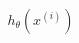 \documentclass[preview]{standalone}
\begin{document}
\begin{align*}
h_{\theta}(x^{(i)})
\end{align*}
\end{document}
